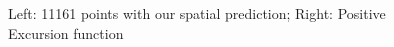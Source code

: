 \documentclass{mcmthesis}
\begin{document}
\begin{figure}[H]
\centering
{}%
%
\centering
\caption{ Left: 11161 points with our spatial prediction; Right: Positive Excursion function}
\end{figure}
\end{document}
